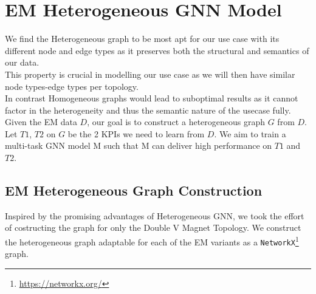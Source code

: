 \documentclass{report} %
\begin{document}
\section{\ac{EM} Heterogeneous \ac{GNN} Model}\label{sec:EM Heterogeneous GNN Model}
We find the Heterogeneous graph to be most apt for our use case with its different node and edge types as it preserves both the structural and semantics of our data. \\
This property is crucial in modelling our use case as we will then have similar node types-edge types per topology. \\
In contrast Homogeneous graphs would lead to suboptimal results as it cannot factor in the heterogeneity and thus the semantic nature of the usecase fully. \\

Given the \ac{EM} data \( D\), our goal is to construct a heterogeneous graph \( G\) from \( D\). Let \( T1\), \( T2\) on \( G\) be the 2 \ac{KPI}s we need to learn from \( D\). 
We aim to train a multi-task \ac{GNN} model M such that M can deliver high performance on \( T1\) and \( T2\).

\subsection{\ac{EM} Heterogeneous Graph Construction}\label{subsec:EM Heterogeneous Graph Construction}
Inspired by the promising advantages of Heterogeneous \ac{GNN}, we took the effort of costructing the graph for only the Double V Magnet Topology.
We construct the heterogeneous graph adaptable for each of the \ac{EM} variants as a \texttt{NetworkX}\footnote{\url{https://networkx.org/}} graph.
\end{document}
